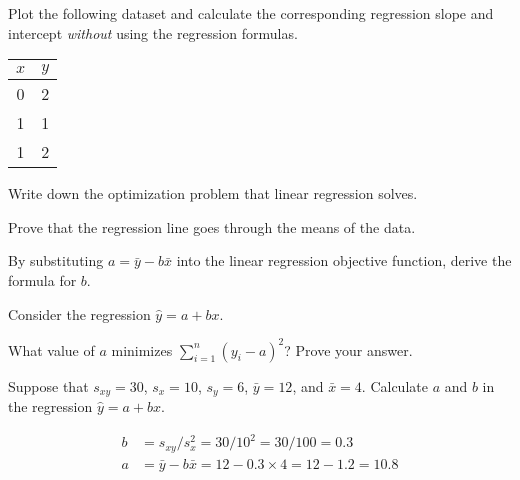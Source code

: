 \documentclass[addpoints,12pt]{exam}
\begin{document}
\begin{questions}

\question Plot the following dataset and calculate the corresponding regression slope and intercept \emph{without} using the regression formulas.\\ 
\begin{tabular}[h]{cc}
  $x$ & $y$\\
  \hline
   0 & 2\\
   1 & 1\\
   1 & 2
\end{tabular}

\question Write down the optimization problem that linear regression solves.

\question Prove that the regression line goes through the means of the data.

\question By substituting $a = \bar{y} - b\bar{x}$ into the linear regression objective function, derive the formula for $b$.

\question Consider the regression $\widehat{y} = a + bx$.

\question What value of $a$ minimizes $\displaystyle\sum_{i=1}^n (y_i - a)^2$? Prove your answer.

\question Suppose that $s_{xy} = 30$, $s_x = 10$, $s_{y} = 6$, $\bar{y} = 12$, and $\bar{x} = 4$. Calculate $a$ and $b$ in the regression $\widehat{y} = a + bx$.
\begin{solution}
  \begin{align*}
  b &= s_{xy}/s_x^2 = 30 / 10^2 = 30/100 = 0.3\\
  a &= \bar{y} - b \bar{x} = 12 - 0.3 \times 4 = 12 - 1.2 = 10.8
  \end{align*}
\end{solution}


\end{questions}
\end{document}

